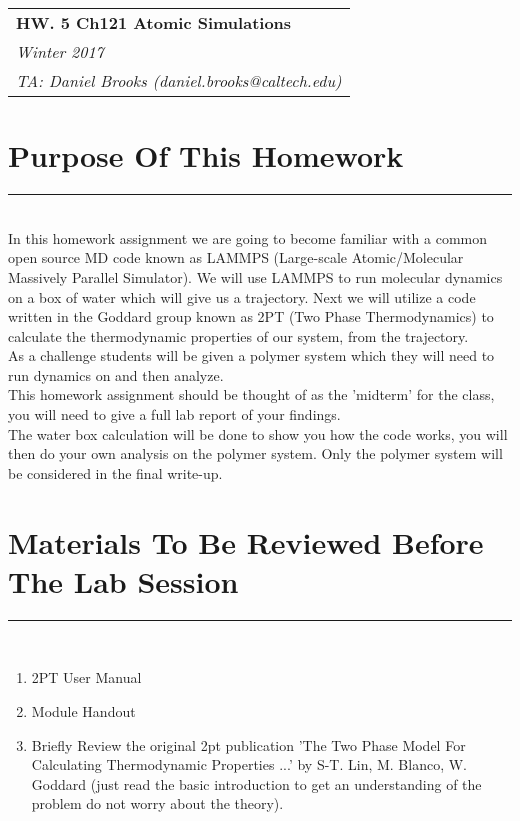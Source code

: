 \documentclass{article}
\begin{document}
\null\hfill\begin{tabular}[t]{l@{}}
  \textbf{HW. 5 Ch121 Atomic Simulations}\\
  \textit{Winter 2017}\\
  \textit{TA: Daniel Brooks (daniel.brooks@caltech.edu)}
\end{tabular}
\vspace{10mm}

\noindent

\section*{Purpose Of This Homework}
\noindent\rule[0.5ex]{\linewidth}{1pt}\\

In this homework assignment we are going to become familiar with a common open source MD code known as LAMMPS (Large-scale Atomic/Molecular Massively Parallel Simulator). 
We will use LAMMPS to run molecular dynamics on a box of water which will give us a trajectory. 
Next we will utilize a code written in the Goddard group known as 2PT (Two Phase Thermodynamics) to calculate the thermodynamic properties of our system, from the trajectory. \\

As a challenge students will be given a polymer system which they will need to run dynamics on and then analyze. \\

This homework assignment should be thought of as the 'midterm' for the class, you will need to give a full lab report of your findings.\\

The water box calculation will be done to show you how the code works, you will then do your own analysis on the polymer system.
Only the polymer system will be considered in the final write-up. \\

\section*{Materials To Be Reviewed Before The Lab Session}
\noindent\rule[0.5ex]{\linewidth}{1pt}\\

\begin{enumerate}
    \item 2PT User Manual
    \item Module Handout
    \item Briefly Review the original 2pt publication 'The Two Phase Model For Calculating Thermodynamic Properties ...' by S-T. Lin, M. Blanco, W. Goddard (just read the basic introduction to get an understanding of the problem do not worry about the theory).
\end{enumerate}
\end{document}
